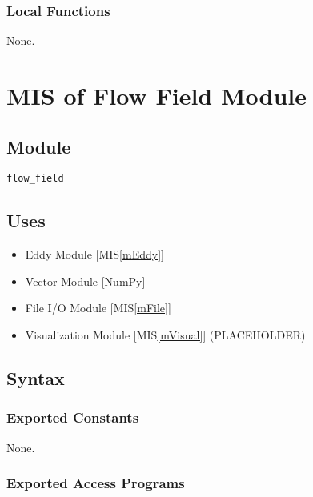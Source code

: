 \documentclass[12pt, titlepage]{article}
\begin{document}
\subsubsection{Local Functions}
None.


\newpage
\section{MIS of Flow Field Module} \label{mFlow} 

\subsection{Module}
\texttt{flow\_field}

\subsection{Uses}
\begin{itemize}
\item Eddy Module [MIS\ref{mEddy}]
\item Vector Module [NumPy]
\item File I/O Module [MIS\ref{mFile}]
\item Visualization Module [MIS\ref{mVisual}] (PLACEHOLDER)
\end{itemize}

\subsection{Syntax}

\subsubsection{Exported Constants}
None.

\subsubsection{Exported Access Programs}
\end{document}
